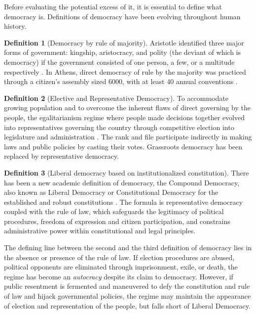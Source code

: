\documentclass{scrartcl}
\theoremstyle{definition}
\newtheorem{definition}{Definition}
\begin{document}
Before evaluating the potential excess of it, it is essential to define what democracy is. Definitions of democracy have been evolving throughout human history. 


\begin{definition}[Democracy by rule of majority]
Aristotle identified three major forms of government: kingship, aristocracy, and polity (the deviant of which is democracy) if the government consisted of one person, a few, or a multitude respectively \autocite{arispol}. In Athens, direct democracy of rule by the majority was practiced through a citizen's assembly sized 6000, with at least 40 annual conventions \autocite{Bao2018}. 
\end{definition}

\begin{definition}[Elective and Representative Democracy]
To accommodate growing population and to overcome the inherent flaws of direct governing by the people, the egalitarianism regime where people made decisions together evolved into representatives governing the country through competitive election into legislature and administration \autocite{capsocdem}. The rank and file participate indirectly in making laws and public policies by casting their votes. Grassroots democracy has been replaced by representative democracy. 
\end{definition}

\begin{definition}[Liberal democracy based on institutionalized constitution]
There has been a new academic definition of democracy, the Compound Democracy, also known as Liberal Democracy or Constitutional Democracy for the established and robust constitutions \autocite{Bao2018}. The formula is representative democracy coupled with the rule of law, which safeguards the legitimacy of political procedures, freedom of expression and citizen participation, and constrains administrative power within constitutional and legal principles. 
\end{definition}

The defining line between the second and the third definition of democracy lies in the absence or presence of the rule of law. If election procedures are abused, political opponents are eliminated through imprisonment, exile, or death, the regime has become an \emph{autocracy} despite its claim to democracy. However, if public resentment is fermented and maneuvered to defy the constitution and rule of law and hijack governmental policies, the regime may maintain the appearance of election and representation of the people, but falls short of Liberal Democracy. 
\end{document}
